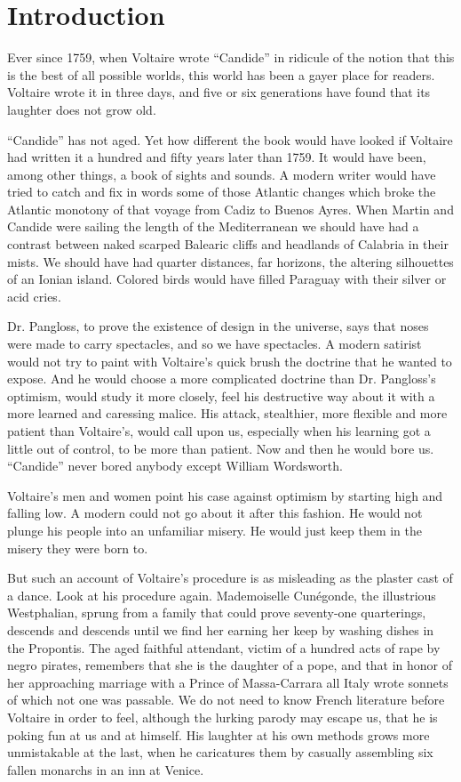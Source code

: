 \chapter*{Introduction}
Ever since 1759, when Voltaire wrote ``Candide'' in ridicule of the notion
that this is the best of all possible worlds, this world has been a
gayer place for readers. Voltaire wrote it in three days, and five or
six generations have found that its laughter does not grow old.

``Candide'' has not aged. Yet how different the book would have looked if
Voltaire had written it a hundred and fifty years later than 1759. It
would have been, among other things, a book of sights and sounds. A
modern writer would have tried to catch and fix in words some of those
Atlantic changes which broke the Atlantic monotony of that voyage from
Cadiz to Buenos Ayres. When Martin and Candide were sailing the length
of the Mediterranean we should have had a contrast between naked scarped
Balearic cliffs and headlands of Calabria in their mists. We should have
had quarter distances, far horizons, the altering silhouettes of an
Ionian island. Colored birds would have filled Paraguay with their
silver or acid cries.

Dr. Pangloss, to prove the existence of design in the universe, says
that noses were made to carry spectacles, and so we have spectacles. A
modern satirist would not try to paint with Voltaire's quick brush the
doctrine that he wanted to expose. And he would choose a more
complicated doctrine than Dr. Pangloss's optimism, would study it more
closely, feel his destructive way about it with a more learned and
caressing malice. His attack, stealthier, more flexible and more patient
than Voltaire's, would call upon us, especially when his learning got a
little out of control, to be more than patient. Now and then he would
bore us. ``Candide'' never bored anybody except William Wordsworth.

Voltaire's men and women point his case against optimism by starting
high and falling low. A modern could not go about it after this fashion.
He would not plunge his people into an unfamiliar misery. He would just
keep them in the misery they were born to.

But such an account of Voltaire's procedure is as misleading as the
plaster cast of a dance. Look at his procedure again. Mademoiselle
Cunégonde, the illustrious Westphalian, sprung from a family that could
prove seventy-one quarterings, descends and descends until we find her
earning her keep by washing dishes in the Propontis. The aged faithful
attendant, victim of a hundred acts of rape by negro pirates, remembers
that she is the daughter of a pope, and that in honor of her
approaching marriage with a Prince of Massa-Carrara all Italy wrote
sonnets of which not one was passable. We do not need to know French
literature before Voltaire in order to feel, although the lurking parody
may escape us, that he is poking fun at us and at himself. His laughter
at his own methods grows more unmistakable at the last, when he
caricatures them by casually assembling six fallen monarchs in an inn at
Venice.

